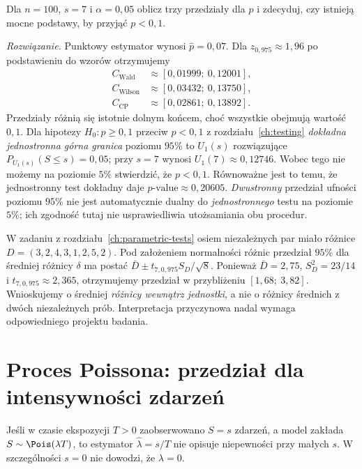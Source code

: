 \begin{zadanie}
\label{zad:ci-seven}
Dla $n=100$, $s=7$ i $\alpha=0{,}05$ oblicz trzy
przedziały dla $p$ i zdecyduj, czy istnieją mocne podstawy,
by przyjąć $p<0{,}1$.
\par\emph{Rozwiązanie.} Punktowy estymator wynosi
$\widehat p=0{,}07$. Dla $z_{0{,}975}\approx1{,}96$
po podstawieniu do wzorów otrzymujemy
\[
 \begin{aligned}
 C_{\mathrm{Wald}}&\approx[0{,}01999;\ 0{,}12001],\\
 C_{\mathrm{Wilson}}&\approx[0{,}03432;\ 0{,}13750],\\
 C_{\mathrm{CP}}&\approx[0{,}02861;\ 0{,}13892].
 \end{aligned}
\]
Przedziały różnią się istotnie dolnym końcem, choć
wszystkie obejmują wartość $0{,}1$. Dla hipotezy
$H_0:p\ge0{,}1$ przeciw $p<0{,}1$ z rozdziału~\ref{ch:testing}
\emph{dokładna jednostronna górna granica} poziomu $95\%$
to $U_1(s)$ rozwiązujące
$P_{U_1(s)}(S\le s)=0{,}05$; przy $s=7$
wynosi $U_1(7)\approx0{,}12746$. Wobec tego
nie możemy na poziomie $5\%$ stwierdzić, że
$p<0{,}1$. Równoważne jest to temu, że jednostronny
test dokładny daje $p\text{-value}\approx0{,}20605$.
\emph{Dwustronny} przedział ufności poziomu $95\%$
nie jest automatycznie dualny do \emph{jednostronnego}
testu na poziomie $5\%$; ich zgodność tutaj nie
usprawiedliwia utożsamiania obu procedur.
\end{zadanie}

\begin{zadanie}
W zadaniu z rozdziału~\ref{ch:parametric-tests} osiem
niezależnych par miało różnice
$D=(3,2,4,3,1,2,5,2)$. Pod założeniem normalności
różnic przedział $95\%$ dla średniej różnicy $\delta$
ma postać $\bar D\pm t_{7,0{,}975}S_D/\sqrt8$.
Ponieważ $\bar D=2{,}75$, $S_D^2=23/14$ i
$t_{7,0{,}975}\approx2{,}365$, otrzymujemy
przedział w przybliżeniu $[1{,}68;\ 3{,}82]$.
Wnioskujemy o średniej \emph{różnicy wewnątrz jednostki},
a nie o różnicy średnich z dwóch niezależnych prób.
Interpretacja przyczynowa nadal wymaga odpowiedniego
projektu badania.
\end{zadanie}

\section{Proces Poissona: przedział dla intensywności zdarzeń}
Jeśli w czasie ekspozycji $T>0$ zaobserwowano $S=s$
zdarzeń, a model zakłada $S\sim\Pois(\lambda T)$,
to estymator $\widehat\lambda=s/T$ nie opisuje niepewności
przy małych $s$. W szczególności $s=0$ nie dowodzi,
że $\lambda=0$.

